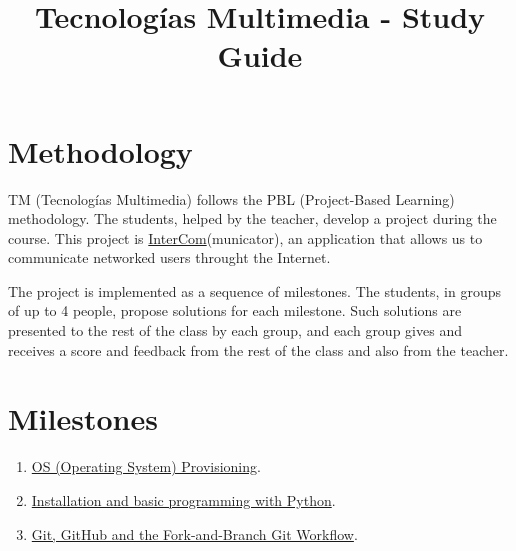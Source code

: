 \title{Tecnologías Multimedia - Study Guide}

\maketitle

\section{Methodology}
TM (Tecnologías Multimedia) follows the PBL (Project-Based Learning) methodology. The students,
helped by the teacher, develop a project during the course. This
project
is \href{https://github.com/Tecnologias-multimedia/intercom}{InterCom}(municator),
an application that allows us to communicate networked users throught
the Internet.

The project is implemented as a sequence of milestones. The students,
in groups of up to 4 people, propose solutions for each
milestone. Such solutions are presented to the rest of the class by
each group, and each group gives and receives a score and feedback
from the rest of the class and also from the teacher.

\section{Milestones}
\begin{enumerate}
\item \href{https://tecnologias-multimedia.github.io/study_guide/milestone00/}{OS (Operating System) Provisioning}.
\item \href{https://tecnologias-multimedia.github.io/study_guide/milestone01/}{Installation and basic programming with Python}.
\item \href{https://tecnologias-multimedia.github.io/study_guide/milestone02/}{Git, GitHub and the Fork-and-Branch Git Workflow}.
\end{enumerate}

